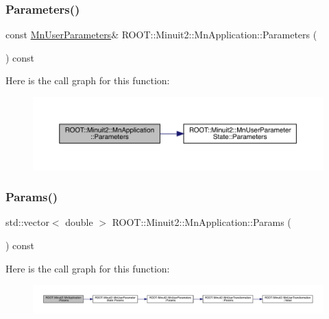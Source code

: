 \subsubsection{\texorpdfstring{Parameters()}{Parameters()}\hspace{0.1cm}{\footnotesize\ttfamily [2/2]}}
{\footnotesize\ttfamily const \mbox{\hyperlink{classROOT_1_1Minuit2_1_1MnUserParameters}{Mn\+User\+Parameters}}\& R\+O\+O\+T\+::\+Minuit2\+::\+Mn\+Application\+::\+Parameters (\begin{DoxyParamCaption}{ }\end{DoxyParamCaption}) const\hspace{0.3cm}{\ttfamily [inline]}}

Here is the call graph for this function\+:
\nopagebreak
\begin{figure}[H]
\begin{center}
\leavevmode
\includegraphics[width=350pt]{df/dd5/classROOT_1_1Minuit2_1_1MnApplication_a8a6af4bd7d2f8af8524bca7a67b2f62d_cgraph}
\end{center}
\end{figure}
\mbox{\label{classROOT_1_1Minuit2_1_1MnApplication_ad4a7808d299103c748b01bd9c2f5b91d}} 
\subsubsection{\texorpdfstring{Params()}{Params()}\hspace{0.1cm}{\footnotesize\ttfamily [1/2]}}
{\footnotesize\ttfamily std\+::vector$<$ double $>$ R\+O\+O\+T\+::\+Minuit2\+::\+Mn\+Application\+::\+Params (\begin{DoxyParamCaption}{ }\end{DoxyParamCaption}) const}

Here is the call graph for this function\+:\nopagebreak
\begin{figure}[H]
\begin{center}
\leavevmode
\includegraphics[width=350pt]{df/dd5/classROOT_1_1Minuit2_1_1MnApplication_ad4a7808d299103c748b01bd9c2f5b91d_cgraph}
\end{center}
\end{figure}
\mbox{\label{classROOT_1_1Minuit2_1_1MnApplication_ae821bfc8bb4659bd3b01835c1d58387c}} 
